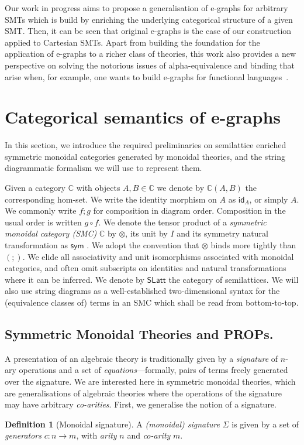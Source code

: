 \documentclass[sigconf, 9pt, nonacm]{acmart}
\theoremstyle{definition}
\newtheorem{definition}[thm]{Definition}
\newcommand\id{\textsf{id}}
\newcommand\sym{\textsf{sym}}
\begin{document}
Our work in progress aims to propose a generalisation of e-graphs for arbitrary SMTs which is build by enriching the underlying categorical structure of a given SMT.
Then, it can be seen that original e-graphs is the case of our construction applied to Cartesian SMTs.
Apart from building the foundation for the application of e-graphs to a richer class of theories, this work also provides a new perspective on solving the notorious issues of alpha-equivalence and binding that arise when, for example, one wants to build e-graphs for functional languages~\cite{koehler2022sketchguided}.

\section{Categorical semantics of e-graphs}

In this section,  we introduce the required preliminaries on semilattice enriched symmetric monoidal categories generated by monoidal theories,  and the string diagrammatic formalism we will use to represent them.  

Given a category $\mathbb{C}$  with objects $A,B \in \mathbb{C}$ we denote by $\mathbb{C}(A,B)$ the corresponding hom-set.  We write the identity morphism on $A$ as $\id_A$,  or simply $A$.  We commonly write $f;g$ for composition in diagram order.  Composition in the usual order is written $g \circ f$.  We denote the tensor product of a \textit{symmetric monoidal category (SMC)} $\mathbb{C}$ by $\otimes$,  its unit by $I$ and its symmetry natural transformation as $\sym$ \cite{maclane}.  We adopt the convention that $\otimes$ binds more tightly than $(;\!)$.  We elide all associativity and unit isomorphisms associated with monoidal categories,  and often omit subscripts on identities and natural transformations where it can be inferred.  We denote by $\textsf{SLatt}$ the category of semilattices.
We will also use string diagrams as a well-established two-dimensional syntax for the (equivalence classes of) terms in an SMC which shall be read from bottom-to-top.


\subsection{Symmetric Monoidal Theories and PROPs.}

A presentation of an algebraic theory is traditionally given by a \textit{signature} of $n$-ary operations and a set of \textit{equations}---formally,  pairs of terms freely generated over the signature.  We are interested here in symmetric monoidal theories, which are generalisations of algebraic theories where the operations of the signature may have arbitrary \textit{co-arities}.  First,  we generalise the notion of a signature. 
\begin{definition}[Monoidal signature]
A \textit{(monoidal) signature} $\Sigma$ is given by a set of \textit{generators} $c: n \to m$,  with \textit{arity} $n$ and \textit{co-arity} $m$.  %
\end{definition}
\end{document}
